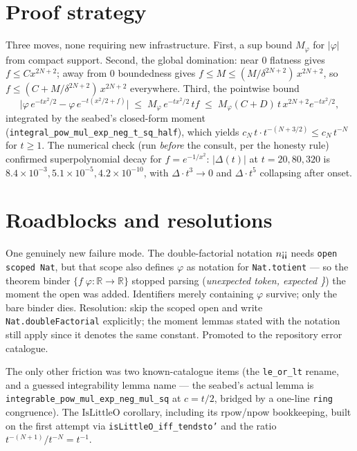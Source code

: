 \documentclass[11pt]{article}
\begin{document}
\section{Proof strategy}

Three moves, none requiring new infrastructure. First, a sup bound
$M_\varphi$ for $|\varphi|$ from compact support. Second, the global
domination: near $0$ flatness gives $f \le C x^{2N+2}$; away from
$0$ boundedness gives $f \le M \le (M/\delta^{2N+2})\,x^{2N+2}$, so
$f \le (C + M/\delta^{2N+2})\,x^{2N+2}$ everywhere. Third, the
pointwise bound
\[
\bigl|\varphi\,e^{-tx^2/2} - \varphi\,e^{-t(x^2/2+f)}\bigr|
 \;\le\; M_\varphi\, e^{-tx^2/2}\, t f
 \;\le\; M_\varphi (C{+}D)\, t\, x^{2N+2} e^{-tx^2/2},
\]
integrated by the seabed's closed-form moment
(\texttt{integral\_pow\_mul\_exp\_neg\_t\_sq\_half}), which yields
$c_N\, t \cdot t^{-(N+3/2)} \le c_N\, t^{-N}$ for $t \ge 1$. The
numerical check (run \emph{before} the consult, per the honesty rule)
confirmed superpolynomial decay for $f = e^{-1/x^2}$:
$|\Delta(t)|$ at $t = 20, 80, 320$ is
$8.4\times10^{-3}, 5.1\times10^{-5}, 4.2\times10^{-10}$, with
$\Delta\cdot t^3 \to 0$ and $\Delta \cdot t^5$ collapsing after onset.

\section{Roadblocks and resolutions}

One genuinely new failure mode. The double-factorial notation
$n\text{\textexclamdown\textexclamdown}$ needs \texttt{open scoped
Nat}, but that scope also defines $\varphi$ as notation for
\texttt{Nat.totient} --- so the theorem binder
$\{f\;\varphi : \mathbb{R} \to \mathbb{R}\}$ stopped parsing
(\emph{unexpected token, expected \}}) the moment the open was added.
Identifiers merely containing $\varphi$ survive; only the bare binder
dies. Resolution: skip the scoped open and write
\texttt{Nat.doubleFactorial} explicitly; the moment lemmas stated with
the notation still apply since it denotes the same constant. Promoted
to the repository error catalogue.

The only other friction was two known-catalogue items (the
\texttt{le\_or\_lt} rename, and a guessed integrability lemma name ---
the seabed's actual lemma is
\texttt{integrable\_pow\_mul\_exp\_neg\_mul\_sq} at $c = t/2$, bridged
by a one-line \texttt{ring} congruence). The $\mathrm{IsLittleO}$
corollary, including its rpow/npow bookkeeping, built on the first
attempt via \texttt{isLittleO\_iff\_tendsto'} and the ratio
$t^{-(N+1)}/t^{-N} = t^{-1}$.
\end{document}
